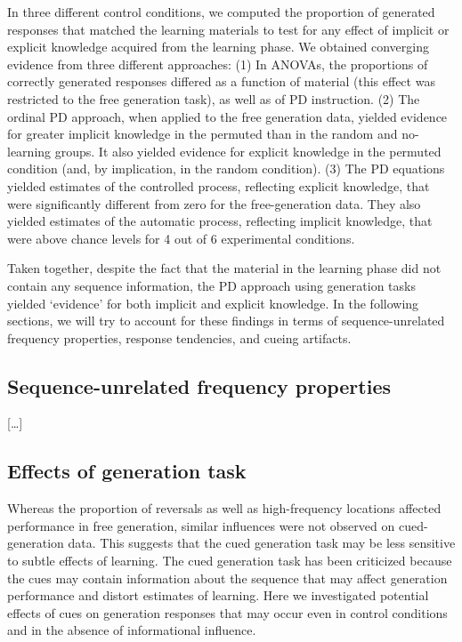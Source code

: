 \documentclass[
  english,
  man]{apa6}
\begin{document}
In three different control conditions, we computed the proportion of generated responses that matched the learning materials to test for any effect of implicit or explicit knowledge acquired from the learning phase.
We obtained converging evidence from three different approaches:
(1) In ANOVAs, the proportions of correctly generated responses differed as a function of material (this effect was restricted to the free generation task), as well as of PD instruction.
(2) The ordinal PD approach, when applied to the free generation data, yielded evidence for greater implicit knowledge in the permuted than in the random and no-learning groups.
It also yielded evidence for explicit knowledge in the permuted condition (and, by implication, in the random condition).
(3) The PD equations yielded estimates of the controlled process, reflecting explicit knowledge, that were significantly different from zero for the free-generation data.
They also yielded estimates of the automatic process, reflecting implicit knowledge, that were above chance levels for 4 out of 6 experimental conditions.

Taken together, despite the fact that the material in the learning phase did not contain any sequence information, the PD approach using generation tasks yielded `evidence' for both implicit and explicit knowledge.
In the following sections, we will try to account for these findings in terms of sequence-unrelated frequency properties, response tendencies, and cueing artifacts.

\hypertarget{sequence-unrelated-frequency-properties}{%
\subsection{Sequence-unrelated frequency properties}\label{sequence-unrelated-frequency-properties}}

{[}\ldots{]}

\hypertarget{effects-of-generation-task}{%
\subsection{Effects of generation task}\label{effects-of-generation-task}}

Whereas the proportion of reversals as well as high-frequency locations affected performance in free generation, similar influences were not observed on cued-generation data.
This suggests that the cued generation task may be less sensitive to subtle effects of learning.
The cued generation task has been criticized because the cues may contain information about the sequence that may affect generation performance and distort estimates of learning.
Here we investigated potential effects of cues on generation responses that may occur even in control conditions and in the absence of informational influence.
\end{document}
